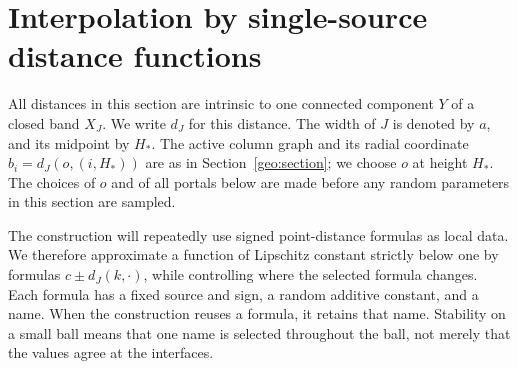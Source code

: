 \section{Interpolation by single-source distance functions}
\label{int:section}

All distances in this section are intrinsic to one connected component
$Y$ of a closed band $X_J$.  We write $d_J$ for this distance.  The width
of $J$ is denoted by $a$, and its midpoint by $H_*$.  The active column
graph and its radial coordinate $b_i=d_J(o,(i,H_*))$ are as in
Section~\ref{geo:section}; we choose $o$ at height $H_*$.  The choices of
$o$ and of all portals below are made before any random parameters in
this section are sampled.

The construction will repeatedly use signed point-distance formulas as
local data. We therefore approximate a function of Lipschitz constant
strictly below one by formulas $c\pm d_J(k,\cdot)$, while controlling where the
selected formula changes. Each formula has a fixed source and sign, a
random additive constant, and a name. When the construction reuses a
formula, it retains that name. Stability on a small ball means that one
name is selected throughout the ball, not merely that the values agree
at the interfaces.


